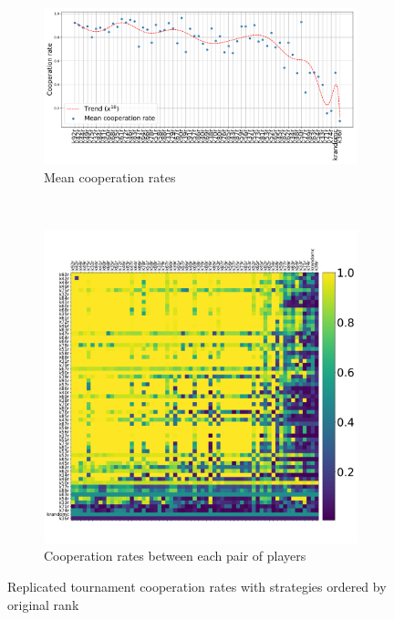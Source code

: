 \documentclass{article}
\begin{document}
\begin{figure}[!hbtp]
    \begin{subfigure}{.6\textwidth}
        \centering
        \includegraphics[width=.9\textwidth]{assets/original_tournament_cooperation_rate_versus_rank.pdf}
        \caption{Mean cooperation rates}
        \label{fig:original_tournament_cooperation_rate_versus_rank}
    \end{subfigure}%
    ~
    \begin{subfigure}{.4\textwidth}
        \centering
        \includegraphics[width=.9\textwidth]{assets/original_tournament_pairwise_cooperation_rates.pdf}
        \caption{Cooperation rates between each pair of players}
        \label{fig:original_tournament_pairwise_cooperation_rates}
    \end{subfigure}
    \caption{Replicated tournament cooperation rates with strategies 
             ordered by original rank}
    \label{fig:replicated_cooperation_rates}
\end{figure}
\end{document}

